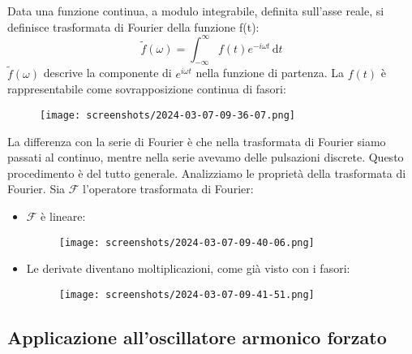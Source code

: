 \begin{definition}
	Data una funzione continua, a modulo integrabile, definita sull'asse reale, si definisce trasformata di Fourier della funzione f(t):
	\[
		\widetilde{f}(\omega )=\int_{-\infty}^{\infty} f(t)e^{-i \omega t} \,\mathrm{d}t  
	\]
	\(\widetilde{f}(\omega ) \) descrive la componente di \(e^{i \omega t}\) nella funzione di partenza. La \(f(t)\) è rappresentabile come sovrapposizione continua di fasori:
	\begin{figure}[H]
		\centering
		\texttt{[image: screenshots/2024-03-07-09-36-07.png]}
	\end{figure}   
\end{definition}

La differenza con la serie di Fourier è che nella trasformata di Fourier siamo passati al continuo, mentre nella serie avevamo delle pulsazioni discrete. Questo procedimento è del tutto generale. Analizziamo le proprietà della trasformata di Fourier. Sia \(\mathcal{F} \) l'operatore trasformata di Fourier:

\begin{itemize}
	
	\item \(\mathcal{F} \) è lineare:
	\begin{figure}[H]
		\centering
		\texttt{[image: screenshots/2024-03-07-09-40-06.png]}
	\end{figure}
	
	\item Le derivate diventano moltiplicazioni, come già visto con i fasori:
	\begin{figure}[H]
		\centering
		\texttt{[image: screenshots/2024-03-07-09-41-51.png]}
	\end{figure}
\end{itemize}

\subsection{Applicazione all'oscillatore armonico forzato}

